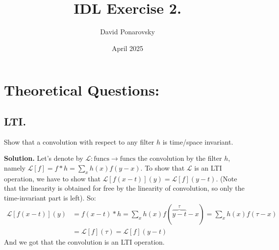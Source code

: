 \documentclass{article}
\title{IDL Exercise 2.}
\author{David Ponarovsky}
\date{April 2025}
\begin{document}
\maketitle

\section{Theoretical Questions:}

\subsection{LTI.} Show that a convolution with respect to any filter $h$ is time/space invariant.


\textbf{Solution.} Let's denote by $\mathcal{L} : \text{funcs} \rightarrow \text{funcs}$ the convolution by the filter $h$, namely $\mathcal{L}[f] = f*h = \sum_{x}{h(x)f(y-x)}$. To show that $\mathcal{L}$ is an LTI operation, we have to show that $\mathcal{L}[f(x-t)](y) = \mathcal{L}[f](y-t)$. (Note that the linearity is obtained for free by the linearity of convolution, so only the time-invariant part is left). So:
\begin{equation*}
    \begin{split}
      \mathcal{L}[f(x-t)](y) &=  f(x-t)*h = \sum_{x}{h(x)f( \overbrace{y-t}^{\tau}-x)} = \sum_{x}{h(x)f(\tau-x)}\\
      &= \mathcal{L}[f](\tau) = \mathcal{L}[f](y-t)
    \end{split}
\end{equation*}
And we got that the convolution is an LTI operation.
 
\end{document}
